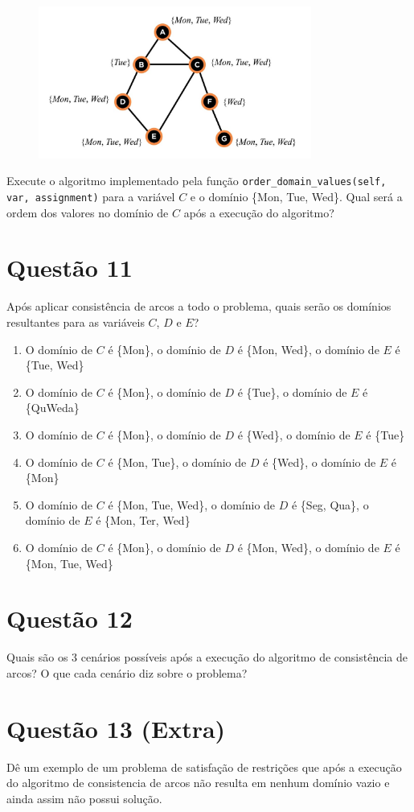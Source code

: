 \documentclass{article}
\begin{document}
\begin{figure}[!ht]
    \centering
    \includegraphics[width=0.8\textwidth]{constraintnetwork.jpg}
\end{figure}

Execute o algoritmo implementado pela função \texttt{order\_domain\_values(self, var, assignment)} para a variável \( C \) e o domínio \{Mon, Tue, Wed\}. Qual será a ordem dos valores no domínio de \( C \) após a execução do algoritmo? 

\section*{Questão 11}

Após aplicar consistência de arcos a todo o problema, quais serão os domínios resultantes para as variáveis \( C \), \( D \) e \( E \)?

\begin{enumerate}
    \item O domínio de \( C \) é \{Mon\}, o domínio de \( D \) é \{Mon, Wed\}, o domínio de \( E \) é \{Tue, Wed\}
    \item O domínio de \( C \) é \{Mon\}, o domínio de \( D \) é \{Tue\}, o domínio de \( E \) é \{QuWeda\}
    \item O domínio de \( C \) é \{Mon\}, o domínio de \( D \) é \{Wed\}, o domínio de \( E \) é \{Tue\}
    \item O domínio de \( C \) é \{Mon, Tue\}, o domínio de \( D \) é \{Wed\}, o domínio de \( E \) é \{Mon\}
    \item O domínio de \( C \) é \{Mon, Tue, Wed\}, o domínio de \( D \) é \{Seg, Qua\}, o domínio de \( E \) é \{Mon, Ter, Wed\}
    \item O domínio de \( C \) é \{Mon\}, o domínio de \( D \) é \{Mon, Wed\}, o domínio de \( E \) é \{Mon, Tue, Wed\}
\end{enumerate}

\section*{Questão 12}

Quais são os 3 cenários possíveis após a execução do algoritmo de consistência de arcos? O que cada cenário diz sobre o problema?

\section*{Questão 13 (Extra)}

Dê um exemplo de um problema de satisfação de restrições que após a execução do algoritmo de consistencia de arcos não resulta em nenhum domínio vazio e ainda assim não possui solução.
\end{document}
